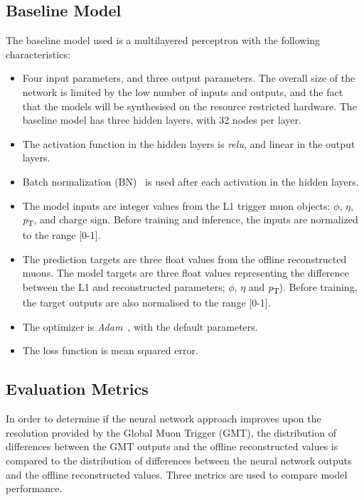 \documentclass[10pt, paper=a4, UKenglish]{article}
\begin{document}
\subsection{Baseline Model}
The baseline model used is a multilayered perceptron with the following characteristics:

\begin{itemize}

    \item Four input parameters, and three output parameters. The overall size of the network is limited by the low number of inputs and outputs, and the fact that the models will be synthesised on the resource restricted hardware. The baseline model has three hidden layers, with 32 nodes per layer.
    
    \item The activation function in the hidden layers is \textit{relu}, and linear in the output layers.

    \item Batch normalization (BN)~\cite{bn} is used after each activation in the hidden layers.

    \item The model inputs are integer values from the L1 trigger muon objects: $\phi$, $\eta$, \textit{p}\textsubscript{T}, and charge sign. Before training and inference, the inputs are normalized to the range [0-1].

    \item The prediction targets are three float values from the offline reconstructed muons. The model targets are three float values representing the difference between the L1 and reconstructed parameters; $\phi$, $\eta$ and \textit{p}\textsubscript{T}). Before training, the target outputs are also normalised to the range [0-1].
    
    \item The optimizer is \textit{Adam}~\cite{Adam}, with the default parameters.
    
    \item The loss function is mean squared error.

\end{itemize}

\subsection{Evaluation Metrics}



In order to determine if the neural network approach improves upon the resolution provided by the Global Muon Trigger (GMT), the distribution of differences between the GMT outputs and the offline reconstructed values is compared to the distribution of differences between the neural network outputs and the offline reconstructed values. Three metrics are used to compare model performance. 
\end{document}
